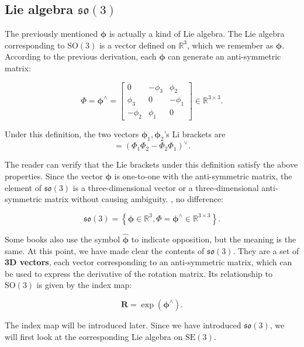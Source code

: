 \subsection{Lie algebra $\mathfrak{so}(3)$}

The previously mentioned $\boldsymbol{\phi}$ is actually a kind of Lie algebra. The Lie algebra corresponding to $\mathrm{SO}(3)$ is a vector defined on $\mathbb{R}^3$, which we remember as $\boldsymbol{\phi}$. According to the previous derivation, each $\boldsymbol{\phi}$ can generate an anti-symmetric matrix:

\begin{equation}
\label{eq:phi}
\boldsymbol{\varPhi} = \boldsymbol{\phi}^{\wedge} = \left[ {\begin{array}{*{20}{c}}
	0&{ - {\phi _3}}&{{\phi _2}}\\
	{{\phi _3}}&0&{ - {\phi _1}}\\
	{ - {\phi _2}}&{{\phi _1}}&0
	\end{array}} \right] \in \mathbb{R}^{3 \times 3}.
\end{equation}

Under this definition, the two vectors $\boldsymbol{\phi}_1, \boldsymbol{\phi}_2$'s Li brackets are
\begin{equation}
[\boldsymbol{\phi}_1, \boldsymbol{\phi}_2] = \left( \bm{ \varPhi }_1 \bm{ \varPhi }_2 - \bm{ \varPhi }_2 \bm{ \varPhi }_1 \right)^\vee.
\end{equation}

The reader can verify that the Lie brackets under this definition satisfy the above properties. Since the vector $\boldsymbol{\phi}$ is one-to-one with the anti-symmetric matrix, the element of $\mathfrak{so}(3)$ is a three-dimensional vector or a three-dimensional anti-symmetric matrix without causing ambiguity. , no difference:

\begin{equation}
\mathfrak{so}(3) = \left\{ \boldsymbol{\phi} \in \mathbb{R}^3, \boldsymbol{\varPhi} = \boldsymbol{\phi^\wedge} \in \mathbb{ R}^{3 \times 3} \right\}.
\end{equation}

Some books also use the symbol $\widehat{\boldsymbol{\phi}}$ to indicate opposition, but the meaning is the same. At this point, we have made clear the contents of $\mathfrak{so}(3)$. They are a set of \textbf{3D vectors}, each vector corresponding to an anti-symmetric matrix, which can be used to express the derivative of the rotation matrix. Its relationship to $\mathrm{SO}(3)$ is given by the index map:

\begin{equation}
\bm{R} = \exp ( \boldsymbol{\phi}^\wedge ).
\end{equation}

The index map will be introduced later. Since we have introduced $\mathfrak{so}(3)$, we will first look at the corresponding Lie algebra on $\mathrm{SE}(3)$.
